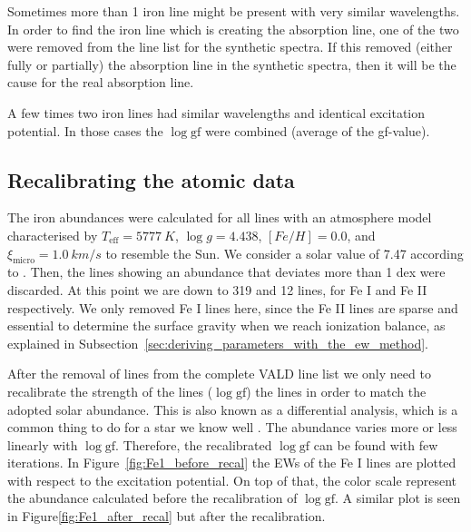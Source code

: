 \documentclass{aa}
\begin{document}
Sometimes more than 1 iron line might be present with very similar
wavelengths. In order to find the iron line which is creating the
absorption line, one of the two were removed from the line list for
the synthetic spectra. If this removed (either fully or partially) the
absorption line in the synthetic spectra, then it will be the cause for
the real absorption line.

A few times two iron lines had similar wavelengths and identical
excitation potential. In those cases the $\log \mathrm{gf}$ were
combined (average of the gf-value).


\subsection{Recalibrating the atomic data}
\label{ssub:Recalibrating-the-atomic-data}

The iron abundances were calculated for all lines with an atmosphere
model characterised by $T_\mathrm{eff}=\SI{5777}{K}$, $\log g =
4.438$, $[Fe/H] = 0.0$, and $\xi_\mathrm{micro} = \SI{1.0}{km/s}$
to resemble the Sun. We consider a solar value of 7.47 according to
\cite{Gonzales2000}. Then, the lines showing an abundance that deviates
more than 1 dex were discarded. At this point we are down to 319 and
12 lines, for Fe I and Fe II respectively. We only removed Fe I lines
here, since the Fe II lines are sparse and essential to determine the
surface gravity when we reach ionization balance, as explained in
Subsection~\ref{sec:deriving_parameters_with_the_ew_method}.

After the removal of lines from the complete VALD line list we only need
to recalibrate the strength of the lines ($\log \mathrm{gf}$) the lines
in order to match the adopted solar abundance. This is also known as a
differential analysis, which is a common thing to do for a star we know
well \citep{Onehag2012}. The abundance varies more or less linearly
with $\log \mathrm{gf}$. Therefore, the recalibrated $\log \mathrm{gf}$
can be found with few iterations. In Figure~\ref{fig:Fe1_before_recal}
the EWs of the Fe I lines are plotted with respect to the excitation
potential. On top of that, the color scale represent the abundance
calculated before the recalibration of $\log \mathrm{gf}$. A similar
plot is seen in Figure\ref{fig:Fe1_after_recal} but after the
recalibration.
\end{document}
